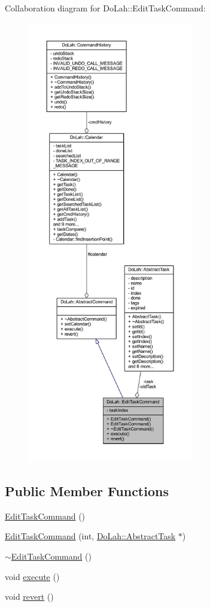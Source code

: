 Collaboration diagram for Do\+Lah\+:\+:Edit\+Task\+Command\+:\nopagebreak
\begin{figure}[H]
\begin{center}
\leavevmode
\includegraphics[height=550pt]{class_do_lah_1_1_edit_task_command__coll__graph}
\end{center}
\end{figure}
\subsection*{Public Member Functions}
\begin{DoxyCompactItemize}
\item 
\hyperlink{class_do_lah_1_1_edit_task_command_a713dd96c0a23290223c87ffc8e40f0ba}{Edit\+Task\+Command} ()
\item 
\hyperlink{class_do_lah_1_1_edit_task_command_a62b3668cb06e9a7c1f8a90505c6b5939}{Edit\+Task\+Command} (int, \hyperlink{class_do_lah_1_1_abstract_task}{Do\+Lah\+::\+Abstract\+Task} $\ast$)
\item 
\hyperlink{class_do_lah_1_1_edit_task_command_a7e8305d22d500750a8e037d46f6d7a60}{$\sim$\+Edit\+Task\+Command} ()
\item 
void \hyperlink{class_do_lah_1_1_edit_task_command_ae49f66ed0e3eaf276b9171b21aa1aa48}{execute} ()
\item 
void \hyperlink{class_do_lah_1_1_edit_task_command_ac4ed306ed190674f27d1afab248aea2a}{revert} ()
\end{DoxyCompactItemize}
